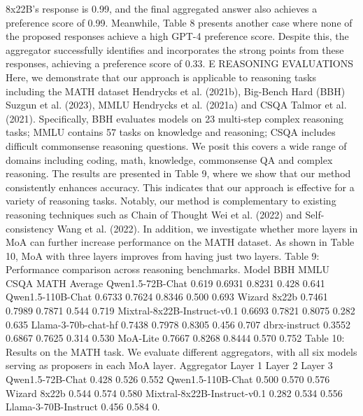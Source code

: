8x22B’s response is 0.99, and the final aggregated answer also achieves a preference score of 0.99.
Meanwhile, Table 8 presents another case where none of the proposed responses achieve a high
GPT-4 preference score. Despite this, the aggregator successfully identifies and incorporates the
strong points from these responses, achieving a preference score of 0.33.
E
REASONING EVALUATIONS
Here, we demonstrate that our approach is applicable to reasoning tasks including the MATH dataset
Hendrycks et al. (2021b), Big-Bench Hard (BBH) Suzgun et al. (2023), MMLU Hendrycks et al.
(2021a) and CSQA Talmor et al. (2021). Specifically, BBH evaluates models on 23 multi-step
complex reasoning tasks; MMLU contains 57 tasks on knowledge and reasoning; CSQA includes
difficult commonsense reasoning questions. We posit this covers a wide range of domains including
coding, math, knowledge, commonsense QA and complex reasoning.
The results are presented in Table 9, where we show that our method consistently enhances accuracy.
This indicates that our approach is effective for a variety of reasoning tasks. Notably, our method
is complementary to existing reasoning techniques such as Chain of Thought Wei et al. (2022) and
Self-consistency Wang et al. (2022).
In addition, we investigate whether more layers in MoA can further increase performance on the
MATH dataset. As shown in Table 10, MoA with three layers improves from having just two layers.
Table 9: Performance comparison across reasoning benchmarks.
Model
BBH
MMLU
CSQA
MATH
Average
Qwen1.5-72B-Chat
0.619
0.6931
0.8231
0.428
0.641
Qwen1.5-110B-Chat
0.6733
0.7624
0.8346
0.500
0.693
Wizard 8x22b
0.7461
0.7989
0.7871
0.544
0.719
Mixtral-8x22B-Instruct-v0.1
0.6693
0.7821
0.8075
0.282
0.635
Llama-3-70b-chat-hf
0.7438
0.7978
0.8305
0.456
0.707
dbrx-instruct
0.3552
0.6867
0.7625
0.314
0.530
MoA-Lite
0.7667
0.8268
0.8444
0.570
0.752
Table 10: Results on the MATH task. We evaluate different aggregators, with all six models serving
as proposers in each MoA layer.
Aggregator
Layer 1
Layer 2
Layer 3
Qwen1.5-72B-Chat
0.428
0.526
0.552
Qwen1.5-110B-Chat
0.500
0.570
0.576
Wizard 8x22b
0.544
0.574
0.580
Mixtral-8x22B-Instruct-v0.1
0.282
0.534
0.556
Llama-3-70B-Instruct
0.456
0.584
0.

